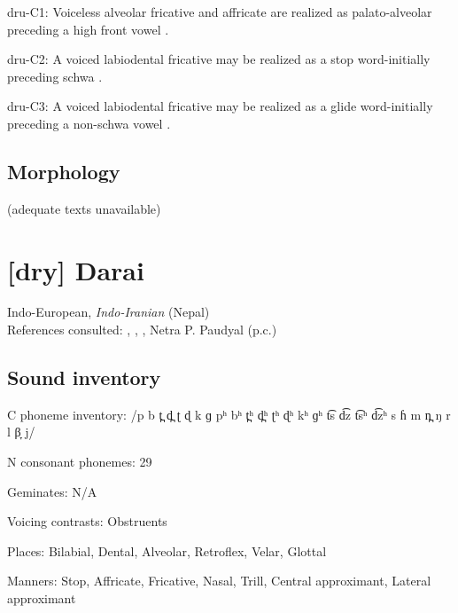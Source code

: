 {\begin{appendixdesc}
\item[dru-C1:] Voiceless alveolar fricative and affricate are realized as palato-alveolar preceding a high front vowel \citep[230]{Chen2006}.

\item[dru-C2:] A voiced labiodental fricative may be realized as a stop word-initially preceding schwa \citep[227]{Chen2006}.

\item[dru-C3:] A voiced labiodental fricative may be realized as a glide word-initially preceding a non-schwa vowel \citep[227]{Chen2006}.
\end{appendixdesc}
\subsection*{Morphology}

(adequate texts unavailable)

\section*{[dry] Darai}  %
Indo-European, \textit{Indo-Iranian} (Nepal)\medskip\\
References consulted: \citet{Dhakal2012}, \citet{KotapishKotapish1973}, \citet{Paudyal2003}, Netra P. Paudyal (p.c.)

\subsection*{Sound inventory}
\begin{appendixdesc}

\item[C phoneme inventory:] /p b t̪ d̪ ʈ ɖ k ɡ pʰ bʰ t̪ʰ d̪ʰ ʈʰ ɖʰ kʰ ɡʰ t͡s d͡z t͡sʰ d͡zʰ s ɦ m n̪ ŋ r l β̞ j/

\item[N consonant phonemes:] 29

\item[Geminates:] N/A

\item[Voicing contrasts:] Obstruents

\item[Places:] Bilabial, Dental, Alveolar, Retroflex, Velar, Glottal

\item[Manners:] Stop, Affricate, Fricative, Nasal, Trill, Central approximant, Lateral approximant


\end{appendixdesc}}
